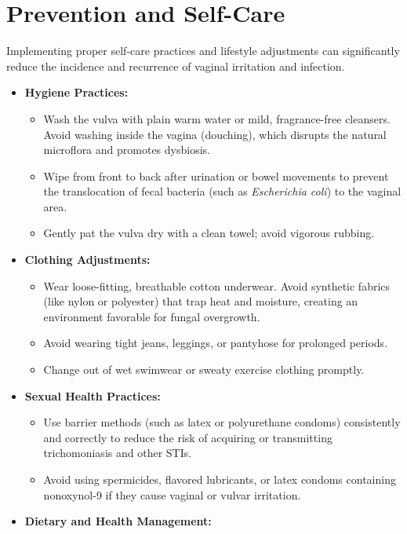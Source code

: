 \section*{Prevention and Self-Care}
Implementing proper self-care practices and lifestyle adjustments can significantly reduce the incidence and recurrence of vaginal irritation and infection.
\begin{itemize}
    \item \textbf{Hygiene Practices:}
    \begin{itemize}
        \item Wash the vulva with plain warm water or mild, fragrance-free cleansers. Avoid washing inside the vagina (douching), which disrupts the natural microflora and promotes dysbiosis.
        \item Wipe from front to back after urination or bowel movements to prevent the translocation of fecal bacteria (such as \textit{Escherichia coli}) to the vaginal area.
        \item Gently pat the vulva dry with a clean towel; avoid vigorous rubbing.
    \end{itemize}
    \item \textbf{Clothing Adjustments:}
    \begin{itemize}
        \item Wear loose-fitting, breathable cotton underwear. Avoid synthetic fabrics (like nylon or polyester) that trap heat and moisture, creating an environment favorable for fungal overgrowth.
        \item Avoid wearing tight jeans, leggings, or pantyhose for prolonged periods.
        \item Change out of wet swimwear or sweaty exercise clothing promptly.
    \end{itemize}
    \item \textbf{Sexual Health Practices:}
    \begin{itemize}
        \item Use barrier methods (such as latex or polyurethane condoms) consistently and correctly to reduce the risk of acquiring or transmitting trichomoniasis and other STIs.
        \item Avoid using spermicides, flavored lubricants, or latex condoms containing nonoxynol-9 if they cause vaginal or vulvar irritation.
    \end{itemize}
    \item \textbf{Dietary and Health Management:}
    \begin{itemize}

\end{itemize}
\end{itemize}
